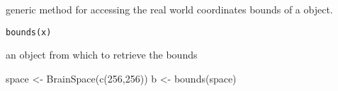 \begin{Description}\relax
generic method for accessing the real world coordinates bounds of a
 object.
\end{Description}
\begin{Usage}
\begin{verbatim}
bounds(x)
\end{verbatim}
\end{Usage}
\begin{Arguments}
\begin{ldescription}
\item[\code{x}] an object from which to retrieve the bounds
\end{ldescription}
\end{Arguments}
\begin{Examples}
\begin{ExampleCode}

space <- BrainSpace(c(256,256))
b <- bounds(space)

\end{ExampleCode}
\end{Examples}

